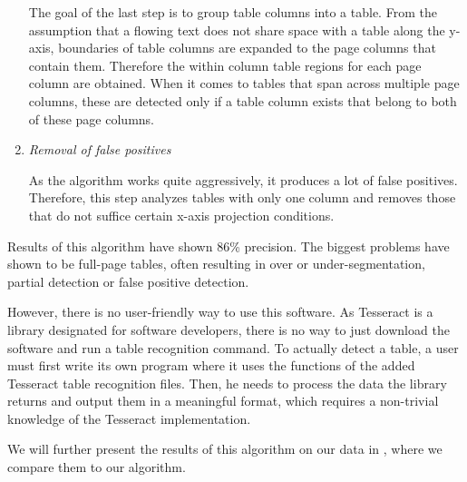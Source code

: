 \begin{enumerate}
The goal of the last step is to group table columns into a table. From the assumption that a flowing text does not share space with a table along the y-axis, boundaries of table columns are expanded to the page columns that contain them. Therefore the within column table regions for each page column are obtained. When it comes to tables that span across multiple page columns, these are detected only if a table column exists that belong to both of these page columns.

\item \emph{Removal of false positives}

As the algorithm works quite aggressively, it produces a lot of false positives. Therefore, this step analyzes tables with only one column and removes those that do not suffice certain x-axis projection conditions.

\end{enumerate}

Results of this algorithm have shown 86\% precision. The biggest problems have shown to be full-page tables, often resulting in over or under-segmentation, partial detection or false positive detection.

However, there is no user-friendly way to use this software. As Tesseract is a library designated for software developers, there is no way to just download the software and run a table recognition command. To actually detect a table, a user must first write its own program where it uses the functions of the added Tesseract table recognition files. Then, he needs to process the data the library returns and output them in a meaningful format, which requires a non-trivial knowledge of the Tesseract implementation.

We will further present the results of this algorithm on our data in , where we compare them to our algorithm.
   
